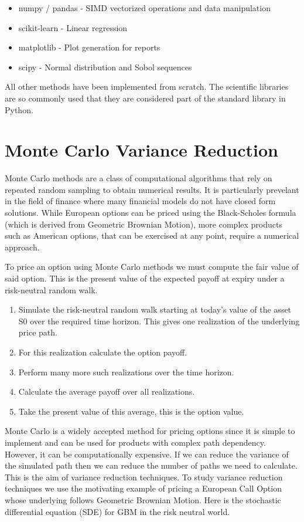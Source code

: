 \documentclass{article}
\newcommand{\para}{\vspace{8pt}} %
\begin{document}
\begin{itemize}
    \item numpy / pandas - SIMD vectorized operations and data manipulation
    \item scikit-learn - Linear regression
    \item matplotlib - Plot generation for reports
    \item scipy - Normal distribution and Sobol sequences
\end{itemize}

All other methods have been implemented from scratch. The scientific libraries are so commonly used that they are considered part of the standard library in Python.

\newpage

\section{Monte Carlo Variance Reduction}

Monte Carlo methods are a class of computational algorithms that rely on repeated random sampling to obtain numerical results. It is particularly prevelant in the field of finance
where many financial models do not have closed form solutions. While European options can be priced using the Black-Scholes formula (which is derived from Geometric Brownian Motion), more complex 
products such as American options, that can be exercised at any point, require a numerical approach. 

\para
To price an option using Monte Carlo methods we must compute the fair value of said option. This is the present value of the expected payoff at expiry under a risk-neutral random walk. 

\begin{enumerate}
    \item Simulate the risk-neutral random walk starting at today's value of the asset S0 over the required time horizon. This gives one realization of the underlying price path.
    \item For this realization calculate the option payoff.
    \item Perform many more such realizations over the time horizon.
    \item Calculate the average payoff over all realizations.
    \item Take the present value of this average, this is the option value.
\end{enumerate}

Monte Carlo is a widely accepted method for pricing options since it is simple to implement and can be used for products with complex path dependency. However, it can be computationally expensive.  If we 
can reduce the variance of the simulated path then we can reduce the number of paths we need to calculate. This is the aim of variance reduction techniques.  To study variance reduction techniques we use 
the motivating example of pricing a European Call Option whose underlying follows Geometric Brownian Motion. Here is the stochastic differential equation (SDE) for GBM in the risk neutral world. 
\end{document}
